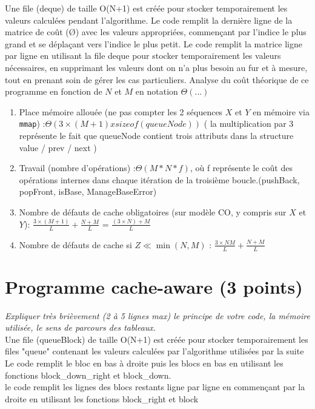 \documentclass[10pt,a4paper]{article}
\begin{document}
Une file (deque) de taille O(N+1) est créée pour stocker temporairement les valeurs calculées pendant l'algorithme.
Le code remplit la dernière ligne de la matrice de coût (Ø) avec les valeurs appropriées, commençant par l'indice le plus grand et se déplaçant vers l'indice le plus petit.
Le code remplit la matrice ligne par ligne en utilisant la file deque pour stocker temporairement les valeurs nécessaires, en supprimant les valeurs dont on n'a plus besoin au fur et à mesure, tout en prenant soin de gérer les cas particuliers.
Analyse du coût théorique de ce programme en fonction de $N$ et $M$ en notation $\Theta(...)$
\begin{enumerate}
  \item Place mémoire allouée (ne pas compter les 2 séquences $X$ et $Y$ en mémoire via {\tt mmap}) :$\Theta( 3 \times(M + 1) x sizeof(queueNode))$ ( la multiplication par 3 représente le fait que queueNode contient trois attributs dans la structure
  value / prev / next ) \\
  \item Travail (nombre d'opérations) :$\Theta(M * N * f)$, où f représente le coût des opérations internes dans chaque itération de la troisième boucle.(pushBack, popFront, isBase, ManageBaseError)
  \item Nombre de défauts de cache obligatoires (sur modèle CO, y compris sur $X$ et $Y$): $\frac{3 \times (M + 1)}{L} +\frac{N + M}{L}$ = $\frac{(3 \times N) + M}{L}$
  \item Nombre de défauts de cache si $Z \ll \min(N,M)$ : $\frac{3 \times N M}{L} +\frac{N + M}{L}$ 
\end{enumerate}

\section{Programme cache-aware (3 points)}
{\em Expliquer très brièvement (2 à 5 lignes max) le principe de votre code, la mémoire utilisée, le sens de parcours des tableaux.}
\\
Une file (queueBlock) de taille O(N+1) est créée pour stocker temporairement les files "queue" contenant les valeurs calculées par l'algorithme utilisées par la suite
Le code remplit le bloc en bas à droite puis les blocs en bas en utilisant les fonctions block_down_right et block_down. \\
le code remplit les lignes des blocs restants ligne par ligne en commençant par la droite en utilisant
les fonctions block_right et block \\
\end{document}
